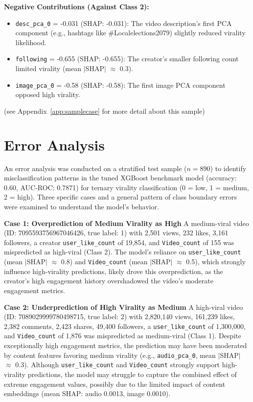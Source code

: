 \documentclass[12pt,a4paper]{report}
\begin{document}
\textbf{Negative Contributions (Against Class 2):}
\begin{itemize}
    \item \texttt{desc\_pca\_0} = -0.031 (SHAP: -0.031): The video description’s first PCA component (e.g., hashtags like \#Localelections2079) slightly reduced virality likelihood.
    \item \texttt{following} = -0.655 (SHAP: -0.655): The creator’s smaller following count limited virality (mean $|$SHAP$|$ $\approx$ 0.3).
    \item \texttt{image\_pca\_0} = -0.58 (SHAP: -0.58): The first image PCA component opposed high virality.
\end{itemize}
(see Appendix~\ref{app:samplecase} for more detail about this sample)
\newpage


\newpage
\section{Error Analysis}
An error analysis was conducted on a stratified test sample ($n=890$) to identify misclassification patterns in the tuned XGBoost benchmark model (accuracy: 0.60, AUC-ROC: 0.7871) for ternary virality classification (0 = low, 1 = medium, 2 = high). Three specific cases and a general pattern of class boundary errors were examined to understand the model’s behavior.

\textbf{Case 1: Overprediction of Medium Virality as High}
A medium-viral video (ID: 7095593756967046426, true label: 1) with 2,501 views, 232 likes, 3,161 followers, a creator \texttt{user\_like\_count} of 19,854, and \texttt{Video\_count} of 155 was mispredicted as high-viral (Class 2). The model’s reliance on \texttt{user\_like\_count} (mean $|$SHAP$|$ $\approx$ 0.8) and \texttt{Video\_count} (mean $|$SHAP$|$ $\approx$ 0.5), which strongly influence high-virality predictions, likely drove this overprediction, as the creator’s high engagement history overshadowed the video’s moderate engagement metrics.

\textbf{Case 2: Underprediction of High Virality as Medium}
A high-viral video (ID: 7089029999780498715, true label: 2) with 2,820,140 views, 161,239 likes, 2,382 comments, 2,423 shares, 49,400 followers, a \texttt{user\_like\_count} of 1,300,000, and \texttt{Video\_count} of 1,876 was mispredicted as medium-viral (Class 1). Despite exceptionally high engagement metrics, the prediction may have been moderated by content features favoring medium virality (e.g., \texttt{audio\_pca\_0}, mean $|$SHAP$|$ $\approx$ 0.3). Although \texttt{user\_like\_count} and \texttt{Video\_count} strongly support high-virality predictions, the model may struggle to capture the combined effect of extreme engagement values, possibly due to the limited impact of content embeddings (mean SHAP: audio 0.0013, image 0.0010).
\end{document}
